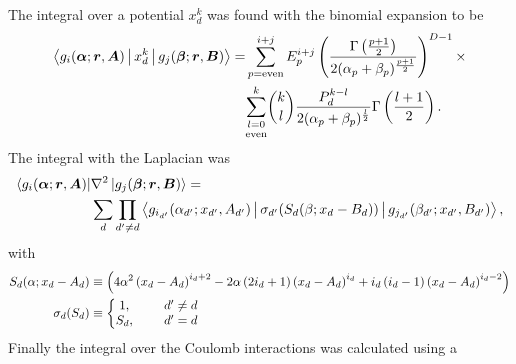     The integral over a potential $x^k_d$ was found with the binomial expansion
    to be
        \begin{equation}
            \begin{aligned}
                \Braket{g_i(\blds{\alpha};\blds{r},\blds{A}) | x^k_d |
                g_j(\blds{\beta};\blds{r},\blds{B})} =&
                \suml{p=\text{even}}{i+j} E^{i+j}_p
                \left(\frac{\Gamma\left(\frac{p+1}{2}\right)}
                {2(\alpha_p+\beta_p)^{\frac{p+1}{2}}}\right)^{D-1} \times \\
                &\underset{\text{even}}{\sum\limits_{l=0}^k} {k\choose l}
                \frac{P^{k-l}_d}{2(\alpha_p+\beta_p)^{\frac{l}{2}}}
                \Gamma\left(\frac{l+1}{2}\right).
            \end{aligned}
        \end{equation}
    The integral with the Laplacian was
        \begin{equation}
            \begin{aligned}
                \Bra{g_i(\blds{\alpha};\blds{r},\blds{A})} &\nabla^2
                \Ket{g_j(\blds{\beta};\blds{r},\blds{B})} = \\
                &\sum_d\prod_{d'\neq d}
                \Braket{g_{i_{d'}}(\alpha_{d'};x_{d'},A_{d'})
                |\sigma_{d'}(S_d(\beta;x_d-B_d))|g_{j_{d'}}(\beta_{d'};x_{d'},B_{d'})},
            \end{aligned}
            \label{eq:lapintdefsum}
        \end{equation}
    with
        \begin{equation}
            \begin{aligned}
                S_d(\alpha;x_d-A_d) &\equiv
                \left(4\alpha^2\left(x_d-A_d\right)^{i_d+2} -
                2\alpha\left(2i_d+1\right)\left(x_d-A_d\right)^{i_d} +
                i_d\left(i_d-1\right)\left(x_d-A_d\right)^{i_d-2}\right) \\
                \sigma_d(S_d) &\equiv \left\{\begin{matrix}
                                            1,&\indent d' \neq d \\
                                            S_d,&\indent d' = d
                                            \end{matrix}
                                        \right.
            \end{aligned}
        \end{equation}
    Finally the integral over the Coulomb interactions was calculated using a
